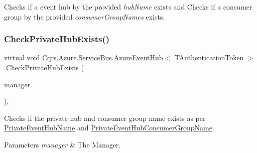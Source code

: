 Checks if a event hub by the provided {\itshape hub\+Name}  exists and Checks if a consumer group by the provided {\itshape consumer\+Group\+Names}  exists. 

\mbox{\label{classCqrs_1_1Azure_1_1ServiceBus_1_1AzureEventHub_a2da39ab1b2bc5fe995b6bd1fea461852_a2da39ab1b2bc5fe995b6bd1fea461852}} 
\subsubsection{\texorpdfstring{Check\+Private\+Hub\+Exists()}{CheckPrivateHubExists()}}
{\footnotesize\ttfamily virtual void \hyperlink{classCqrs_1_1Azure_1_1ServiceBus_1_1AzureEventHub}{Cqrs.\+Azure.\+Service\+Bus.\+Azure\+Event\+Hub}$<$ T\+Authentication\+Token $>$.Check\+Private\+Hub\+Exists (\begin{DoxyParamCaption}\item[{Manager}]{manager }\end{DoxyParamCaption})\hspace{0.3cm}{\ttfamily [protected]}, {\ttfamily [virtual]}}



Checks if the private hub and consumer group name exists as per \hyperlink{classCqrs_1_1Azure_1_1ServiceBus_1_1AzureEventHub_ac6802047e00a92ea4b0ae6b69ef7310a_ac6802047e00a92ea4b0ae6b69ef7310a}{Private\+Event\+Hub\+Name} and \hyperlink{classCqrs_1_1Azure_1_1ServiceBus_1_1AzureEventHub_a0c091d0cb19dda3e8bfc20f0e7d30af3_a0c091d0cb19dda3e8bfc20f0e7d30af3}{Private\+Event\+Hub\+Consumer\+Group\+Name}. 


\begin{DoxyParams}{Parameters}
{\em manager} & The Manager.\\
\hline
\end{DoxyParams}
\mbox{\label{classCqrs_1_1Azure_1_1ServiceBus_1_1AzureEventHub_aee7b4360172cf49fb2e885a3a525aa66_aee7b4360172cf49fb2e885a3a525aa66}} 
